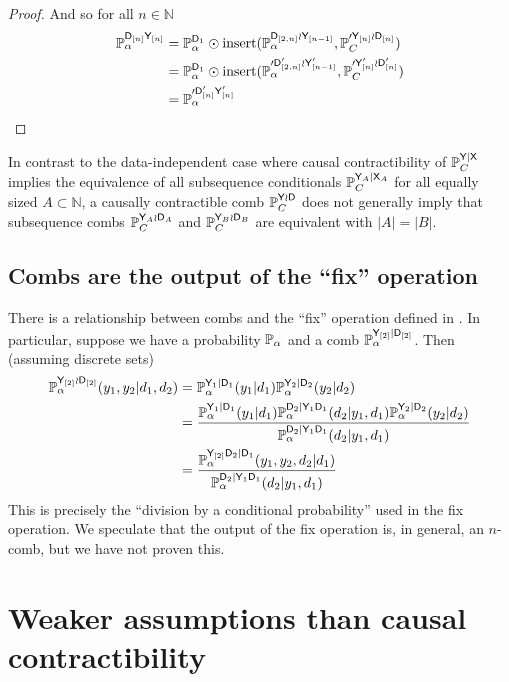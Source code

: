 \begin{proof}
And so for all $n\in \mathbb{N}$
\begin{align}
    \mathbb{P}_\alpha^{\mathsf{D}_{[n]} \mathsf{Y}_{[n]}} &=  \mathbb{P}_\alpha^{\mathsf{D}_1}\odot \text{insert}(\mathbb{P}_\alpha^{ \mathsf{D}_{[2,n]}\wr\mathsf{Y}_{[n-1]}}, \mathbb{P}_C^{\prime \mathsf{Y}_{[n]}\wr\mathsf{D}_{[n]}}) \\
    &= \mathbb{P}_\alpha^{\mathsf{D}_1}\odot \text{insert}(\mathbb{P}_\alpha^{\prime \mathsf{D}'_{[2,n]}\wr\mathsf{Y}'_{[n-1]}}, \mathbb{P}_C^{\prime \mathsf{Y}'_{[n]}\wr\mathsf{D}'_{[n]}}) \\
    &= \mathbb{P}_\alpha^{\prime\mathsf{D}'_{[n]} \mathsf{Y}'_{[n]}}
\end{align}
\end{proof}

In contrast to the data-independent case where causal contractibility of $\mathbb{P}_C^{\mathsf{Y}|\mathsf{X}}$ implies the equivalence of all subsequence conditionals $\mathbb{P}_C^{\mathsf{Y}_A|\mathsf{X}_A}$ for all equally sized $A\subset\mathbb{N}$, a causally contractible comb $\mathbb{P}_C^{\mathsf{Y}\wr \mathsf{D}}$ does not generally imply that subsequence combs $\mathbb{P}_C^{\mathsf{Y}_A\wr \mathsf{D}_A}$ and $\mathbb{P}_C^{\mathsf{Y}_B\wr \mathsf{D}_B}$ are equivalent with $|A|=|B|$.


\subsection{Combs are the output of the ``fix'' operation}

There is a relationship between combs and the ``fix'' operation defined in \citet{richardson_nested_2017}. In particular, suppose we have a probability $\mathbb{P}_\alpha$ and a comb $\mathbb{P}_\alpha^{\mathsf{Y}_{[2]}|\mathsf{D}_{[2]}}$. Then (assuming discrete sets)
\begin{align}
    \mathbb{P}_\alpha^{\mathsf{Y}_{[2]}\wr \mathsf{D}_{[2]}}(y_1,y_2|d_1,d_2) &= \mathbb{P}_\alpha^{\mathsf{Y}_1|\mathsf{D}_1}(y_1|d_1)\mathbb{P}_\alpha^{\mathsf{Y}_2|\mathsf{D}_2}(y_2|d_2)\\
    &= \frac{\mathbb{P}_\alpha^{\mathsf{Y}_1|\mathsf{D}_1}(y_1|d_1)\mathbb{P}_\alpha^{\mathsf{D}_2|\mathsf{Y}_1\mathsf{D}_1}(d_2|y_1,d_1)\mathbb{P}_\alpha^{\mathsf{Y}_2|\mathsf{D}_2}(y_2|d_2)}{\mathbb{P}_\alpha^{\mathsf{D}_2|\mathsf{Y}_1\mathsf{D}_1}(d_2|y_1,d_1)}\\
    &= \frac{\mathbb{P}_\alpha^{\mathsf{Y}_{[2]}\mathsf{D}_2|\mathsf{D}_1}(y_1,y_2,d_2|d_1)}{\mathbb{P}_\alpha^{\mathsf{D}_2|\mathsf{Y}_1\mathsf{D}_1}(d_2|y_1,d_1)}
\end{align}
This is precisely the ``division by a conditional probability'' used in the fix operation. We speculate that the output of the fix operation is, in general, an $n$-comb, but we have not proven this.


\section{Weaker assumptions than causal contractibility}

